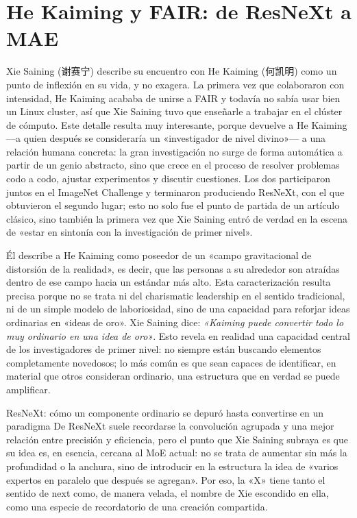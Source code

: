 \section{He Kaiming y FAIR: de ResNeXt a MAE}

Xie Saining (谢赛宁) describe su encuentro con He Kaiming (何凯明) como un punto de inflexión en su vida, y no exagera. La primera vez que colaboraron con intensidad, He Kaiming acababa de unirse a FAIR y todavía no sabía usar bien un Linux cluster, así que Xie Saining tuvo que enseñarle a trabajar en el clúster de cómputo. Este detalle resulta muy interesante, porque devuelve a He Kaiming —a quien después se consideraría un «investigador de nivel divino»— a una relación humana concreta: la gran investigación no surge de forma automática a partir de un genio abstracto, sino que crece en el proceso de resolver problemas codo a codo, ajustar experimentos y discutir cuestiones. Los dos participaron juntos en el ImageNet Challenge y terminaron produciendo ResNeXt, con el que obtuvieron el segundo lugar; esto no solo fue el punto de partida de un artículo clásico, sino también la primera vez que Xie Saining entró de verdad en la escena de «estar en sintonía con la investigación de primer nivel».

Él describe a He Kaiming como poseedor de un «campo gravitacional de distorsión de la realidad», es decir, que las personas a su alrededor son atraídas dentro de ese campo hacia un estándar más alto. Esta caracterización resulta precisa porque no se trata ni del charismatic leadership en el sentido tradicional, ni de un simple modelo de laboriosidad, sino de una capacidad para reforjar ideas ordinarias en «ideas de oro». Xie Saining dice: \textit{«Kaiming puede convertir todo lo muy ordinario en una idea de oro»}. Esto revela en realidad una capacidad central de los investigadores de primer nivel: no siempre están buscando elementos completamente novedosos; lo más común es que sean capaces de identificar, en material que otros consideran ordinario, una estructura que en verdad se puede amplificar.

\begin{importantbox}{ResNeXt: cómo un componente ordinario se depuró hasta convertirse en un paradigma}
De ResNeXt suele recordarse la convolución agrupada y una mejor relación entre precisión y eficiencia, pero el punto que Xie Saining subraya es que su idea es, en esencia, cercana al MoE actual: no se trata de aumentar sin más la profundidad o la anchura, sino de introducir en la estructura la idea de «varios expertos en paralelo que después se agregan». Por eso, la «X» tiene tanto el sentido de next como, de manera velada, el nombre de Xie escondido en ella, como una especie de recordatorio de una creación compartida.
\end{importantbox}

